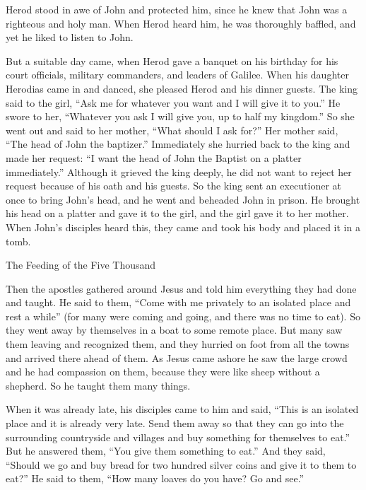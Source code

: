 {Herod
stood in awe
of John
and protected
him,
since he knew
that John
was a righteous
and
holy
man. When Herod heard
him,
he was
thoroughly
baffled,
and yet he liked
to listen
to John.
\par }{\PP {}But
a suitable
day
came,
when
Herod
gave
a banquet
on his
birthday
for his
court officials,
military commanders,
and
leaders
of Galilee.
When
his
daughter
Herodias
came in
and
danced,
she pleased
Herod
and
his dinner guests.
The king
said
to the girl,
“Ask
me
for
whatever
you want
and
I will give
it to you.”
He
swore
to her, “Whatever
you ask
I will give
you,
up
to
half
my
kingdom.”
So
she went out
and said
to
her
mother,
“What
should I ask for?” Her mother said,
“The head
of John
the baptizer.”
Immediately
she
hurried
back
to
the king
and made
her request: “I want
the head
of John
the Baptist
on
a platter
immediately.”
Although it grieved
the king
deeply,
he did
not
want
to reject
her
request because of
his oath
and
his guests.
So
the king
sent
an executioner
at once
to bring
John’s
head, and he went and beheaded John in prison.
He brought
his
head
on
a platter
and
gave
it
to the girl,
and
the girl
gave
it
to her
mother.
When
John’s
disciples
heard
this, they came
and
took
his
body
and
placed
it
in
a tomb.
\par }{\SH The Feeding of the Five Thousand
\par }{\PP {}Then
the apostles
gathered
around
Jesus
and
told
him
everything
they had done
and
taught.
He
said
to them,
“Come
with me privately
to
an isolated
place
and
rest
a while”
(for
many
were coming
and
going,
and
there was no
time
to eat).
So
they went away
by themselves in
a boat
to
some remote
place.
But
many
saw
them
leaving
and
recognized
them, and
they hurried on foot
from
all
the towns
and arrived
there
ahead
of them.
As Jesus came ashore
he saw
the large
crowd
and
he had compassion
on
them,
because
they were
like
sheep
without
a shepherd.
So
he taught
them
many things.
\par }{\PP {}When
it was
already
late,
his
disciples
came
to him
and said,
“This is
an isolated
place
and
it is already
very
late.
Send
them
away
so
that they can go
into
the surrounding
countryside
and
villages
and buy
something
for themselves
to eat.”
But
he answered
them, “You give
them
something to eat.”
And
they said,
“Should
we go
and buy
bread
for two hundred
silver coins
and
give
it to them
to eat?”
He said
to them,
“How many
loaves
do you have? Go
and see.”
}
